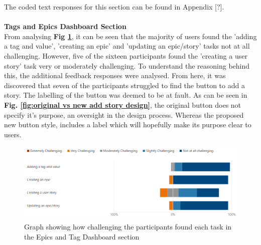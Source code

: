 \documentclass[l4proj.tex]{subfiles}
\begin{document}
The coded text responses for this section can be found in Appendix [?]. \\
\\
\textbf{Tags and Epics Dashboard Section}\\
From analysing \textbf{Fig \ref{fig:epic and tag form feedback}}, it can be seen that the majority of users found the 'adding a tag and value', 'creating an epic' and 'updating an epic/story' tasks not at all challenging. However, five of the sixteen participants found the 'creating a user story' task very or moderately challenging. To understand the reasoning behind this, the additional feedback responses were analysed. From here, it was discovered that seven of the participants struggled to find the button to add a story. The labelling of the button was deemed to be at fault. As can be seen in \textbf{Fig. \ref{fig:original vs new add story design}}, the original button does not specify it's purpose, an oversight in the design process. Whereas the proposed new button style, includes a label which will hopefully make its purpose clear to users. 

\begin{figure}[h!]
\begin{center}
\includegraphics[scale=0.5]{dissertation/images/EvaluationEpicsAndTagsChallengingGraph.png}
\caption{Graph showing how challenging the participants found each task in the Epics and Tag Dashboard section}
\label{fig:epic and tag form feedback} 
\end{center}
\end{figure}
\end{document}
